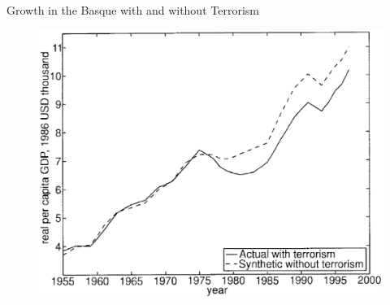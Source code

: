 \documentclass{beamer}
\begin{document}
\begin{frame}{Growth in the Basque with and without Terrorism}
\begin{figure}
\centering
\includegraphics[width=0.8\linewidth]{./Figures/Basque2}
\caption{}
\label{fig:basque2}
\end{figure}
\end{frame}
\end{document}
